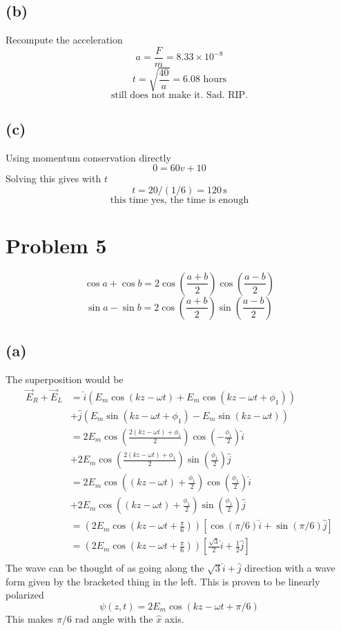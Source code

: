 \documentclass[a4paper]{article}
\begin{document}
\subsection*{(b)} 
Recompute the acceleration 
\[
a = \frac{F}{m} = 8.33 \times 10^{-8}
\] 
\[
t = \sqrt{\frac{40}{a}}  = 6.08 \text{ hours}
\] 
\[
\text{still does not make it. Sad. RIP.}
\] 

\subsection*{(c)} 
Using momentum conservation directly 
\[
0 = 60 v + 10 
\] 
Solving this gives with $t$ 
\[
t = 20 / (1 / 6) = 120 \, \text{s}
\]
\[
\text{this time yes, the time is enough}
\] 


\section*{Problem 5} 
\[
\cos a + \cos b = 
2 
\cos \left(\frac{a+b}{2}\right)
\cos \left(\frac{a-b}{2}\right)
\] 
\[
\sin a - \sin b = 
2 \cos \left(\frac{a+b}{2}\right)
\sin \left(\frac{a-b}{2}\right)
\] 
\subsection*{(a)} 
The superposition would be 
\begin{align*}
\vec{E}_R + 
\vec{E}_L &= 
\hat{i} 
\left(
E_m \cos(kz - \omega t) + E_m \cos(kz - \omega t + \phi_1)
\right)
\\
	  &+ \hat{j}
	  \left(
E_m \sin(kz - \omega t + \phi_1) - E_m \sin(kz - \omega t )
	  \right)
	  \\
	  & = 
	  2 E_m \cos \left( \frac{2(kz - \omega t) + \phi_1}{2}\right) 
	  \cos \left(- \frac{\phi_1}{2}\right) \hat{i} 
	  \\
	  & + 
	  2 E_m \cos \left(\frac{2 (kz - \omega t) + \phi_1}{2}\right)
	  \sin \left(\frac{\phi_1}{2}\right) \hat{j}
	  \\ & = 
	  2 E_m \cos \left( (kz - \omega t) + \frac{\phi_1}{2}\right) 
	  \cos \left( \frac{\phi_1}{2}\right) \hat{i} 
	  \\
	  & + 
	  2 E_m \cos \left( (kz - \omega t) + \frac{\phi_1}{2}\right)
	  \sin \left(\frac{\phi_1}{2}\right) \hat{j} 
	  \\
	  &= 
	  \left(2 E_m \cos \left(k z - \omega t + \frac{\pi}{6}\right)\right) 
	  \left[ \cos( \pi / 6) \hat{i} + \sin (\pi / 6) \hat{j} \right]
	  \\
	  &= 
	  \left(2 E_m \cos \left(k z - \omega t + \frac{\pi}{6}\right)\right) 
	  \left[ \frac{\sqrt{3} }{2}	\hat{i} + \frac{1}{2} \hat{j} \right]
	  \\
\end{align*}
The wave can be thought of as going along the $\sqrt{ 3}  \hat{i} + \hat{j}$ direction with a wave form given by the bracketed thing in the left. This is proven to be linearly polarized
\[
\psi(z,t) = 2 E_m \cos ( k z - \omega t + \pi / 6)
\]
This makes $\pi / 6 \text{ rad}$ angle with the $\hat{x}$ axis.
\end{document}
